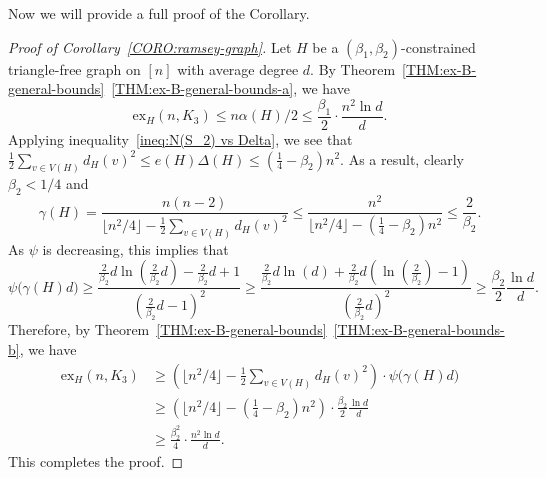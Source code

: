 \documentclass[11pt,a4paper]{article}
\newcommand{\graph}{H}
\begin{document}
Now we will provide a full proof of the Corollary.
\begin{proof}[Proof of Corollary~\ref{CORO:ramsey-graph}]
    Let  $\graph$ be a $(\beta_1, \beta_2)$-constrained triangle-free graph on $[n]$ with average degree $d$. By Theorem~\ref{THM:ex-B-general-bounds}~\eqref{THM:ex-B-general-bounds-a}, we have \[\mathrm{ex}_{\graph}(n, K_{3}) \le {n \alpha(\graph)}/{2} \le \frac{\beta_1 }{2}\cdot \frac{n^2 \ln d}{d}.\] Applying inequality~\eqref{ineq:N(S_2) vs Delta}, we see that $\frac{1}{2} \sum_{v\in V(\graph)} d_{\graph}(v)^2 \le e(\graph) \Delta(\graph) \le \left(\frac{1}{4} - \beta_2 \right) n^2.$ 
    As a result, clearly $\beta_2 < 1/4$ and \[\gamma(H) = \frac{n(n-2)}{\lfloor n^2/4\rfloor - \frac{1}{2} \sum_{v\in V(\graph)} d_{\graph}(v)^2} \le \frac{n^2}{\lfloor n^2/4\rfloor - \left(\frac{1}{4} - \beta_2 \right) n^2} \le \frac{2}{\beta_2}.\]
   As $\psi$ is decreasing, this implies that 
    \[\psi\big( \gamma(\graph) d\big) 
    \ge   \frac{\frac{2}{\beta_2} d\ln\left({\frac{2}{\beta_2}d}\right) - \frac{2}{\beta_2}d + 1}{\left(\frac{2}{\beta_2}d - 1\right)^2} 
    \ge   \frac{\frac{2}{\beta_2} d\ln({d}) + \frac{2}{\beta_2}d\left(\ln(\frac{2}{\beta_2}) - 1\right)}{\left(\frac{2}{\beta_2}d\right)^2} 
    \ge \frac{\beta_2}{2} \frac{\ln{d}}{d}.\]
    Therefore, by Theorem~\ref{THM:ex-B-general-bounds}~\eqref{THM:ex-B-general-bounds-b}, we have            
    \begin{align*} \mathrm{ex}_{\graph}(n, K_{3})
            &\ge \left(\lfloor n^2/4 \rfloor -  \frac{1}{2} \sum_{v\in V(\graph)} d_{\graph}(v)^2 \right) \cdot \psi\big( \gamma(\graph) d\big) \\
            &\ge  \left(\lfloor n^2/4 \rfloor -  \left(\frac{1}{4} - \beta_2 \right) n^2 \right) \cdot \frac{\beta_2}{2} \frac{\ln{d}}{d} \\
            &\ge \frac{\beta_2^2}{4} \cdot \frac{n^2\ln{d}}{d}.
            \end{align*}
    This completes the proof.
\end{proof}
\end{document}
